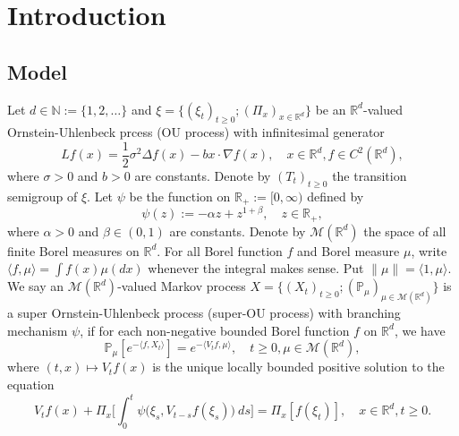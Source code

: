 \documentclass[12pt]{amsart}
\theoremstyle{plain}
\theoremstyle{definition}
\numberwithin{equation}{section}
\begin{document}
\section{Introduction}
\subsection{Model}
    Let $d \in \mathbb N:= \{1,2,\dots\}$ and
    $\xi=\{(\xi_t)_{t\geq 0}; (\Pi_x)_{x\in \mathbb R^d}\}$ be an $\mathbb R^d$-valued Ornstein-Uhlenbeck prcess (OU process) with infinitesimal generator 
\begin{equation}
\label{eq: OU generator}
    Lf(x)
        = \frac{1}{2}\sigma^2\Delta f(x)-b x \cdot \nabla f(x),
        \quad  x\in \mathbb R^d,
        f \in C^2(\mathbb{R}^d),
\end{equation}
    where $\sigma>0$ and $b>0$ are constants.
    Denote by $(T_t)_{t\geq 0}$ the transition semigroup of $\xi$.
    Let $\psi$ be the function on $\mathbb R_+:= [0,\infty)$ defined by
\begin{equation}\label{mechanism}
    \psi(z)
    := - \alpha z + z^{1+\beta},
    \quad z \in \mathbb R_+,
\end{equation}
	where $\alpha > 0$ and $\beta \in (0,1) $ are constants.
    Denote by $\mathcal{M}(\mathbb{R}^d)$ the space of all finite Borel measures on $\mathbb{R}^d$.
    For all Borel function $f$ and Borel measure $\mu$, write $\langle f,\mu\rangle = \int f(x)\mu(dx)$ whenever the integral makes sense.
    Put $\|\mu\|=\langle 1,\mu\rangle$.
    We say an $\mathcal{M}(\mathbb{R}^d)$-valued Markov process $X = \{(X_t)_{t\geq 0}; (\mathbb{P}_{\mu})_{\mu \in \mathcal M(\mathbb R^d)}\}$ is a super Ornstein-Uhlenbeck process (super-OU process) with branching mechanism $\psi$, if for each non-negative bounded Borel function $f$ on $\mathbb{R}^d$, we have
\begin{equation} \label{super}
    \mathbb{P}_{\mu}[e^{-\langle f,X_t \rangle}]
    = e^{-\langle V_tf, \mu \rangle},
    \quad t\geq 0, \mu \in \mathcal M(\mathbb R^d),
\end{equation}
	where $(t,x) \mapsto V_tf(x)$ is the unique locally bounded positive solution to the equation
\begin{equation}\label{eq1}
	V_tf(x) + \Pi_x \Big[ \int_0^t\psi\big(\xi_s,V_{t-s}f(\xi_s)\big)~ds\Big]
	= \Pi_x [f(\xi_t)],
    \quad x\in \mathbb R^d, t\geq 0.
\end{equation}	
\end{document}
